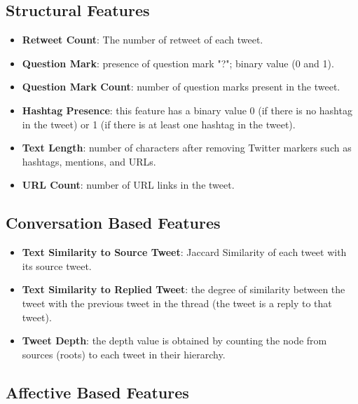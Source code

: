 \documentclass[sigconf]{acmart}
\begin{document}
\subsection{Structural Features}


\begin{itemize}
\item[]{\bf Retweet Count}: The number of retweet of each tweet.
\item[]{\bf Question Mark}: presence of question mark "?"; binary value (0 and 1).
\item[]{\bf Question Mark Count}: 
number of question marks present in the tweet.
\item[]{\bf Hashtag Presence}: this feature has a binary value 0 (if there is no hashtag in the tweet) or 1 (if there is at least one hashtag in the tweet). 
\item[]{\bf Text Length}: number of characters after removing Twitter markers such as hashtags, mentions, and URLs.
\item[]{\bf URL Count}: number of URL links in the tweet.
\end{itemize}

\subsection{Conversation Based Features}


\begin{itemize}
\item[]{\bf Text Similarity to Source Tweet}: Jaccard Similarity of each tweet with its source tweet.
\item[]{\bf Text Similarity to Replied Tweet}: the degree of similarity between the tweet with the previous tweet in the thread (the tweet is a reply to that tweet).
\item[]{\bf Tweet Depth}: the depth value is obtained by counting the node from sources (roots) to each tweet in their hierarchy.
\end{itemize}

\subsection{Affective Based Features}
\end{document}

